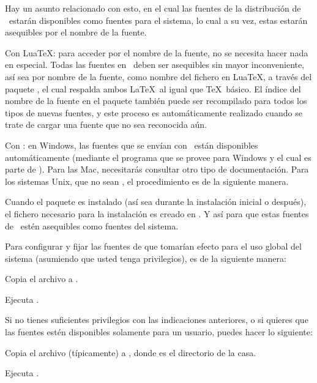 \documentclass{article}
\begin{document}
Hay un asunto relacionado con esto, en el cual las fuentes de la
distribución de \TL\ estarán disponibles como fuentes para el sistema,
lo cual a su vez, estas estarán asequibles por el nombre de la fuente.

Con Lua\TeX: para acceder por el nombre de la fuente, no se necesita
hacer nada en especial. Todas las fuentes en \TL\ deben ser asequibles
sin mayor inconveniente, así sea por nombre de la fuente, como nombre
del fichero en Lua\TeX, a través del paquete , el
cual respalda ambos \LaTeX\ al igual que \TeX\ básico. El índice del
nombre de la fuente en el paquete  también puede ser
recompilado para todos los tipos de nuevas fuentes, y este proceso es
automáticamente realizado cuando se trate de cargar una fuente que no
sea reconocida aún.

Con \XeTeX: en Windows, las fuentes que se envían con \TL\ están
disponibles automáticamente (mediante el programa  que
se provee para Windows y el cual es parte de \TL). Para las Mac,
necesitarás consultar otro tipo de documentación. Para los sistemas
Unix, que no sean \macOS, el procedimiento es de la siguiente manera.

Cuando el paquete   es instalado (así sea durante la
instalación inicial o después), el fichero necesario para la
instalación es creado en
. Y así para que
estas fuentes de \TL\ estén asequibles como fuentes del sistema. 

Para configurar y fijar las fuentes de \TL{} que tomarían efecto para
el uso global del sistema (asumiendo que usted tenga privilegios),
es de la siguiente manera:
\begin{enumerate*} 
	\item Copia el archivo  a
.
\item Ejecuta .  
\end{enumerate*}

Si no tienes suficientes privilegios con las indicaciones anteriores,
o si quieres que las fuentes estén disponibles solamente para un
usuario, puedes hacer lo siguiente:
\begin{enumerate*}
	\item Copia el archivo 
(típicamente) a , donde \filename{~} es el
directorio de la casa.
	\item Ejecuta .
\end{enumerate*}
\end{document}
